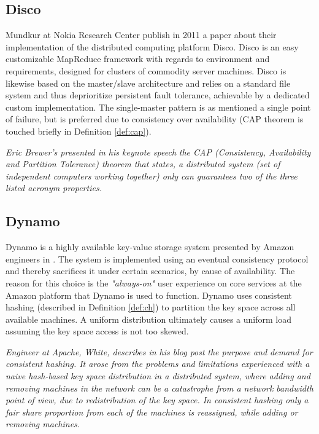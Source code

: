 \subsection*{Disco}
Mundkur \etal at Nokia Research Center publish in 2011 a paper about their implementation of the distributed computing platform Disco\cite{PageDisco}\cite{Mundkur:2011:DCP:2034654.2034670}. Disco is an easy customizable MapReduce framework with regards to environment and requirements, designed for clusters of commodity server machines. Disco is likewise based on the master/slave architecture and relies on a standard file system and thus deprioritize persistent fault tolerance, achievable by a dedicated custom implementation. The single-master pattern is as mentioned a single point of failure, but is preferred due to consistency over availability (CAP theorem is touched briefly in Definition \ref{def:cap}).
\vspace*{3mm}

\begin{definition} \label{def:cap}
\textit{Eric Brewer's presented in his keynote speech}\cite{Brewer2000} \textit{the CAP (Consistency, Availability and Partition Tolerance) theorem that states, a distributed system (set of independent computers working together) only can guarantees two of the three listed acronym properties.}
\end{definition}

\vspace*{3mm}
\subsection*{Dynamo}
Dynamo is a highly available key-value storage system presented by Amazon engineers in \cite{DeCandia:2007:DAH:1294261.1294281}. The system is implemented using an eventual consistency protocol and thereby sacrifices it under certain scenarios, by cause of availability. The reason for this choice is the \textit{"always-on"} user experience on core services at the Amazon platform that Dynamo is used to function. Dynamo uses consistent hashing (described in Definition \ref{def:ch}) to partition the key space across all available machines. A uniform distribution ultimately causes a uniform load assuming the key space access is not too skewed.
\vspace*{3mm}

\begin{definition} \label{def:ch}
\textit{Engineer at Apache, White, describes in his blog post} \cite{PageWhiteCH} \textit{the purpose and demand for consistent hashing. It arose from the problems and limitations experienced with a naive hash-based key space distribution in a distributed system, where adding and removing machines in the network can be a catastrophe from a network bandwidth point of view, due to redistribution of the key space. In consistent hashing only a fair share proportion from each of the machines is reassigned, while adding or removing machines.}
\end{definition}

